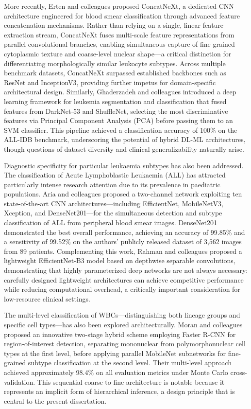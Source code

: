 \documentclass[11pt]{article}
\begin{document}
More recently, Erten and colleagues \cite{erten2025} proposed ConcatNeXt, a dedicated CNN architecture engineered for blood smear classification through advanced feature concatenation mechanisms. Rather than relying on a single, linear feature extraction stream, ConcatNeXt fuses multi-scale feature representations from parallel convolutional branches, enabling simultaneous capture of fine-grained cytoplasmic texture and coarse-level nuclear shape—a critical distinction for differentiating morphologically similar leukocyte subtypes. Across multiple benchmark datasets, ConcatNeXt surpassed established backbones such as ResNet \cite{he2016} and InceptionV3, providing further impetus for domain-specific architectural design. Similarly, Ghaderzadeh and colleagues \cite{ghaderzadeh2021} introduced a deep learning framework for leukemia segmentation and classification that fused features from DarkNet-53 and ShuffleNet, selecting the most discriminative features via Principal Component Analysis (PCA) before passing them to an SVM classifier. This pipeline achieved a classification accuracy of 100\% on the ALL-IDB benchmark, underscoring the potential of hybrid DL-ML architectures, though questions of dataset diversity and clinical generalizability naturally arise.

Diagnostic specificity for particular leukaemia subtypes has also been addressed. The classification of Acute Lymphoblastic Leukaemia (ALL) has attracted particularly intense research attention due to its prevalence in paediatric populations. Aria and colleagues \cite{aria2021} proposed a two-channel network exploiting ten state-of-the-art CNN architectures—including EfficientNet, MobileNetV3, Xception, and DenseNet201—for the simultaneous detection and subtype classification of ALL from peripheral blood smear images. DenseNet201 demonstrated the best overall performance, achieving an accuracy of 99.85\% and a sensitivity of 99.52\% on the authors' publicly released dataset of 3,562 images from 89 patients. Complementing this work, Rahman and colleagues \cite{rahman2023} proposed a lightweight EfficientNet-B3 model based on depthwise separable convolutions, demonstrating that highly parameterized deep networks are not always necessary: carefully designed lightweight architectures can achieve competitive performance while reducing computational overhead, a critically important consideration for low-resource clinical settings.

The multi-level classification of WBCs—distinguishing both lineage groups and specific cell types—has also been explored architecturally. Moran and colleagues \cite{moran2022} proposed an innovative two-stage hybrid scheme employing Faster R-CNN for region-of-interest detection, separating mononuclear from polymorphonuclear cell types at the first level, before applying parallel MobileNet subnetworks for fine-grained subtype classification at the second level. Their multi-level approach achieved approximately 98.4\% on all evaluation metrics under Monte Carlo cross-validation. This sequential coarse-to-fine architecture is notable because it represents an implicit form of hierarchical inference, a design principle that is central to the present dissertation.
\end{document}

